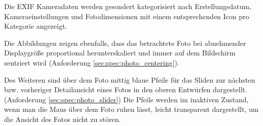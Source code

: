 Die EXIF Kameradaten werden gesondert kategorisiert nach Erstellungsdatum, Kameraeinstellungen und Fotodimensionen mit einem entsprechenden Icon pro Kategorie angezeigt.

Die Abbildungen zeigen ebenfalls, dass das betrachtete Foto bei abnehmender Displaygröße proportional herunterskaliert und immer auf dem Bildschirm zentriert wird (Anforderung \ref{sec:spec:photo_centering}).

Des Weiteren sind über dem Foto mittig blaue Pfeile für das Sliden zur nächsten bzw. vorheriger Detailansicht eines Fotos in den oberen Entwürfen dargestellt. (Anforderung \ref{sec:spec:photo_slider}) Die Pfeile werden im inaktiven Zustand, wenn man die Maus über dem  Foto ruhen lässt, leicht transparent dargestellt, um die Ansicht des Fotos nicht zu stören.

